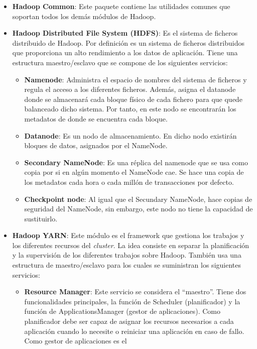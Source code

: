 \begin{itemize}
\item \textbf{Hadoop Common}: Este paquete contiene las utilidades comunes
  que soportan todos los demás módulos de Hadoop.
\item \textbf{Hadoop Distributed File System (HDFS)}: Es el sistema de
  ficheros distribuido de Hadoop. Por definición es un sistema de ficheros
  distribuidos que proporciona un alto rendimiento a los datos de
  aplicación. Tiene una estructura maestro/esclavo que se compone de los
  siguientes servicios:
  \begin{itemize}
  \item \textbf{Namenode}: Administra el espacio de nombres del sistema de
    ficheros y regula el acceso a los diferentes ficheros. Además, asigna
    el datanode donde se almacenará cada bloque físico de cada fichero para
    que quede balanceado dicho sistema. Por tanto, en este nodo se
    encontrarán los metadatos de donde se encuentra cada bloque.
  \item \textbf{Datanode}: Es un nodo de almacenamiento. En dicho nodo
    existirán bloques de datos, asignados por el NameNode.
  \item \textbf{Secondary NameNode}: Es una réplica del namenode que se usa
    como copia por si en algún momento el NameNode cae. Se hace una copia
    de los metadatos cada hora o cada millón de transacciones por defecto.
  \item \textbf{Checkpoint node}: Al igual que el Secundary NameNode, hace
    copias de seguridad del NameNode, sin embargo, este nodo no tiene la
    capacidad de sustituirlo.
  \end{itemize}
\item \textbf{Hadoop YARN}: Este módulo es el framework que gestiona los
  trabajos y los diferentes recursos del \emph{cluster}. La idea consiste en
  separar la planificación y la supervisión de los diferentes trabajos
  sobre Hadoop. También usa una estructura de maestro/esclavo para los
  cuales se suministran los siguientes servicios:
  \begin{itemize}
  \item \textbf{Resource Manager}: Este servicio se considera el “maestro”.
    Tiene dos funcionalidades principales, la función de Scheduler
    (planificador) y la función de ApplicationsManager (gestor de
    aplicaciones). Como planificador debe ser capaz de asignar los recursos
    necesarios a cada aplicación cuando lo necesite o reiniciar una
    aplicación en caso de fallo. Como gestor de aplicaciones es el

\end{itemize}
\end{itemize}
